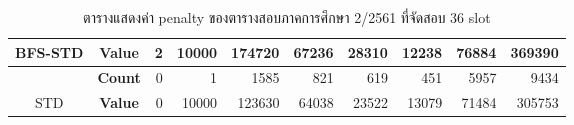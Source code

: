 \begin{table}[]
{\begin{tabular}{@{}ccrrrrrrrr@{}}
    \multirow{-2}{*}{BFS-STD}                    & \textbf{Value}                        & 2                              & 10000                          & 174720                         & 67236                          & 28310                          & 12238                          & 76884                          & 369390                           \\ \midrule
                                                  & {\textbf{Count}} & {0}       & {1}       & {1585}    & {821}     & {619}     & {451}     & {5957}    & {9434}      \\ \cmidrule(l){2-10} 
    \multirow{-2}{*}{STD} & {\textbf{Value}} & {0}       & {10000}   & {123630}  & {64038}   & {23522}   & {13079}   & {71484}   & {305753}    \\ \bottomrule
    \end{tabular}%
    }
    \caption{ตารางแสดงค่า penalty ของตารางสอบภาคการศึกษา 2/2561 ที่จัดสอบ 36 slot}
    \label{tab:result_table_261_36}
\end{table}
